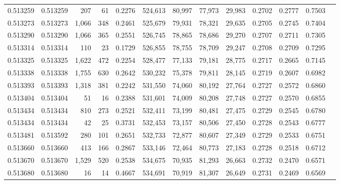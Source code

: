 \begin{tabular}{rrrrrrrrrrrrr}
0.513259 & 0.513259 &   207 &    61 &                                     0.2276 & 524,613 &  80,997 &  77,973 &  29,983 & 0.2702 & 0.2777 & 0.7503 \\
0.513273 & 0.513273 & 1,066 &   348 &                                     0.2461 & 525,679 &  79,931 &  78,321 &  29,635 & 0.2705 & 0.2745 & 0.7404 \\
0.513290 & 0.513290 & 1,066 &   365 &                                     0.2551 & 526,745 &  78,865 &  78,686 &  29,270 & 0.2707 & 0.2711 & 0.7305 \\
0.513314 & 0.513314 &   110 &    23 &                                     0.1729 & 526,855 &  78,755 &  78,709 &  29,247 & 0.2708 & 0.2709 & 0.7295 \\
0.513325 & 0.513325 & 1,622 &   472 &                                     0.2254 & 528,477 &  77,133 &  79,181 &  28,775 & 0.2717 & 0.2665 & 0.7145 \\
0.513338 & 0.513338 & 1,755 &   630 &                                     0.2642 & 530,232 &  75,378 &  79,811 &  28,145 & 0.2719 & 0.2607 & 0.6982 \\
0.513393 & 0.513393 & 1,318 &   381 &                                     0.2242 & 531,550 &  74,060 &  80,192 &  27,764 & 0.2727 & 0.2572 & 0.6860 \\
0.513404 & 0.513404 &    51 &    16 &                                     0.2388 & 531,601 &  74,009 &  80,208 &  27,748 & 0.2727 & 0.2570 & 0.6855 \\
0.513434 & 0.513434 &   810 &   273 &                                     0.2521 & 532,411 &  73,199 &  80,481 &  27,475 & 0.2729 & 0.2545 & 0.6780 \\
0.513434 & 0.513434 &    42 &    25 &                                     0.3731 & 532,453 &  73,157 &  80,506 &  27,450 & 0.2728 & 0.2543 & 0.6777 \\
0.513481 & 0.513592 &   280 &   101 &                                     0.2651 & 532,733 &  72,877 &  80,607 &  27,349 & 0.2729 & 0.2533 & 0.6751 \\
0.513660 & 0.513660 &   413 &   166 &                                     0.2867 & 533,146 &  72,464 &  80,773 &  27,183 & 0.2728 & 0.2518 & 0.6712 \\
0.513670 & 0.513670 & 1,529 &   520 &                                     0.2538 & 534,675 &  70,935 &  81,293 &  26,663 & 0.2732 & 0.2470 & 0.6571 \\
0.513680 & 0.513680 &    16 &    14 &                                     0.4667 & 534,691 &  70,919 &  81,307 &  26,649 & 0.2731 & 0.2469 & 0.6569 \\

\end{tabular}
